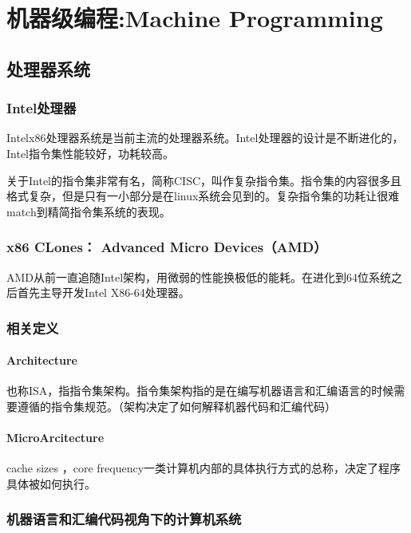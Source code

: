\section{机器级编程:Machine Programming}

\subsection{处理器系统}

\subsubsection{Intel处理器}
Intelx86处理器系统是当前主流的处理器系统。Intel处理器的设计是不断进化的，Intel指令集性能较好，功耗较高。

关于Intel的指令集非常有名，简称CISC，叫作复杂指令集。指令集的内容很多且格式复杂，但是只有一小部分是在linux系统会见到的。复杂指令集的功耗让很难match到精简指令集系统的表现。

\subsubsection{x86 CLones： Advanced Micro Devices（AMD）}

AMD从前一直追随Intel架构，用微弱的性能换极低的能耗。在进化到64位系统之后首先主导开发Intel X86-64处理器。

\subsubsection{相关定义}

\paragraph{Architecture}

也称ISA，指指令集架构。指令集架构指的是在编写机器语言和汇编语言的时候需要遵循的指令集规范。（架构决定了如何解释机器代码和汇编代码）

\paragraph{MicroArcitecture}

cache sizes ，core frequency一类计算机内部的具体执行方式的总称，决定了程序具体被如何执行。

\subsubsection{机器语言和汇编代码视角下的计算机系统}

